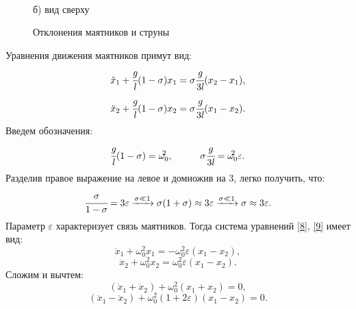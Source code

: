 \documentclass[a4paper,12pt]{article}
\theoremstyle{plain} %
\theoremstyle{definition} %
\theoremstyle{remark} %
\begin{document}
\begin{figure}
\begin{minipage}[h]{0.45\linewidth}
		 \\б) вид сверху
	\end{minipage}
	\hfill
	\caption{Отклонения маятников и струны}
	\label{ris2}
\end{figure}
Уравнения движения маятников примут вид:
\begin{equation}
\ddot{x}_1+\cfrac{g}{l} (1-\sigma)x_1=\sigma\cfrac{g}{3l}(x_2-x_1),
\label{8}
\end{equation}
\begin{equation}
\ddot{x}_2+\cfrac{g}{l} (1-\sigma)x_2=\sigma\cfrac{g}{3l}(x_1-x_2).
\label{9}
\end{equation}
Введем обозначения:
$$\cfrac{g}{l}(1-\sigma)=\omega^{\!\!2}_0, \hspace{1cm} \sigma\cfrac{g}{3l}=\omega^{\!\!2}_0 \varepsilon.$$
Разделив правое выражение на левое и домножив на 3, легко получить, что:
$$\cfrac{\sigma}{1-\sigma}=3\varepsilon \xrightarrow{\sigma \ll 1} \sigma(1+\sigma) \approx 3\varepsilon \xrightarrow{\sigma \ll 1} \sigma \approx 3\varepsilon.$$
Параметр $\varepsilon$ характеризует связь маятников. Тогда система уравнений \eqref{8}, \eqref{9} имеет вид:
\begin{equation}
\ddot{x}_1+\omega^2_0 x_1=-\omega^2_0\varepsilon(x_1-x_2),
\label{10}
\end{equation}
\begin{equation}
\ddot{x}_2+\omega^2_0 x_2=\omega^2_0\varepsilon(x_1-x_2).
\label{11}
\end{equation}
Сложим и вычтем:
\begin{equation}
(\ddot{x}_1+\ddot{x}_2)+\omega^2_0(x_1+x_2)=0,
\label{12}
\end{equation}
\begin{equation}
(\ddot{x}_1-\ddot{x}_2)+\omega^2_0(1+2\varepsilon)(x_1-x_2)=0.
\label{13}
\end{equation}
\end{document}
